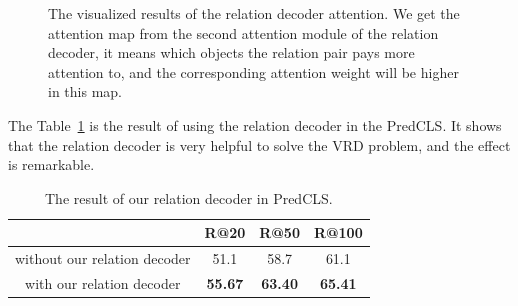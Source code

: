 \begin{figure}[!htp]
	
	\caption[The visualized results of the relation decoder attention.]{The visualized results of the relation decoder attention. We get the attention map from the second attention module of the relation decoder, it means which objects the relation pair pays more attention to, and the corresponding  attention weight will be higher in this map.}
	\label{fig:relation_attetnion}
\end{figure}

The Table~\ref{tab:result_relation_decoder} is the result of using the relation decoder in the PredCLS. It shows that the relation decoder is very helpful to solve the VRD problem, and the effect is remarkable.

\begin{table}[!h]
	\centering
	\begin{tabular}{c|ccc}
		\bottomrule
		& R@20    & R@50    & R@100      \\ \hline
		without our relation decoder  & 51.1    &58.7      & 61.1    \\
		with our relation decoder      & \textbf{55.67} & \textbf{63.40} & \textbf{65.41}     \\ \bottomrule
	\end{tabular}
	
	\caption[The result of our relation decoder in PredCLS]{The result of our relation decoder in PredCLS.}
	\label{tab:result_relation_decoder}
\end{table}

